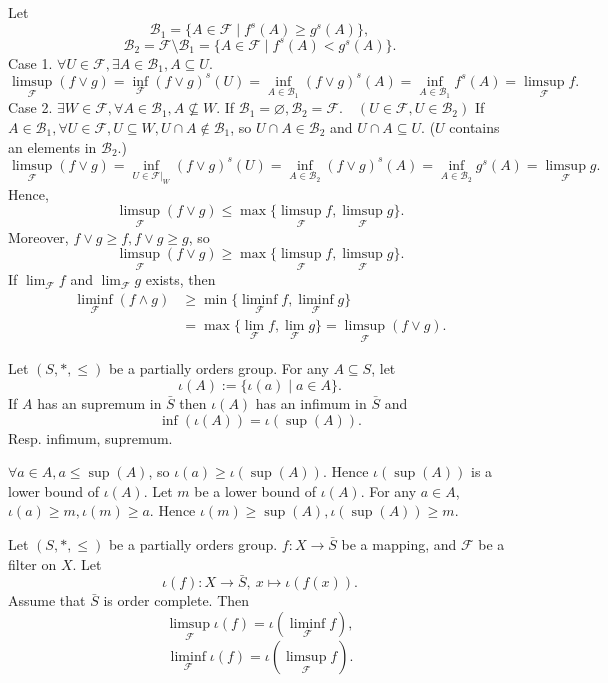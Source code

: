 \begin{proofenv}
    Let $$\mathcal{B}_1=\{A\in \mathcal{F}\mid f^s(A)\ge g^s(A)\},$$
    $$\mathcal{B}_2=\mathcal{F}\setminus\mathcal{B}_1=\{A\in\mathcal{F}\mid f^s(A)<g^s(A)\}.$$
    Case 1. $\forall U\in \mathcal{F},\exists A\in \mathcal{B}_1, A\subseteq U$.
    $$\limsup_\mathcal{F}(f\vee g)=\inf_{\mathcal{F}}(f\vee g)^s(U)=\inf_{A\in \mathcal{B}_1}(f\vee g)^s(A)=\inf _{A\in \mathcal{B}_1}f^s(A)=\limsup_{\mathcal{F}}f.$$
    Case 2. $\exists W\in \mathcal{F}, \forall A\in \mathcal{B}_1,A\nsubseteq  W$. If $\mathcal{B}_1=\varnothing, \mathcal{B}_2=\mathcal{F}.\quad (U\in \mathcal{F},U\in\mathcal{B}_2)$ If $A\in \mathcal{B}_1, \forall U\in \mathcal{F}, U\subseteq W, U\cap A\notin \mathcal{B}_1 $, so $U\cap A\in \mathcal{B}_2$ and $U\cap A\subseteq U$. ($U$ contains an elements in $\mathcal{B}_2$.)
    $$\limsup_{\mathcal{F}}(f\vee g)=\inf _{U\in \mathcal{F}|_W}(f\vee g)^s(U)=\inf_{A\in \mathcal{B}_2}(f\vee g)^s(A)=\inf_{A\in \mathcal{B}_2}g^s(A)=\limsup_{\mathcal{F}}g.$$
    Hence,
    $$\limsup_{\mathcal{F}}(f\vee g)\le \max\{\limsup_{\mathcal{F}}f,\limsup_{\mathcal{F}}g\}.$$
    Moreover, $f\vee g\ge f, f\vee g\ge g$, so
    $$\limsup_{\mathcal{F}}(f\vee g)\ge \max\{\limsup_{\mathcal{F}}f,\limsup_{\mathcal{F}}g\}.$$
    If $\lim_{\mathcal{F}}f$ and $\lim_{\mathcal{F}}g$ exists, then
    \begin{align*}
        \liminf_{\mathcal{F}}(f\wedge g)&\ge \min\{\liminf_{\mathcal{F}}f,\liminf_{\mathcal{F}}g\}\\
        &=\max\{\lim_\mathcal{F} f,\lim_\mathcal{F} g\}=\limsup_{\mathcal{F}}(f\vee g).
    \end{align*}
\end{proofenv}
\begin{propositionenv}
    Let $(S,*,\le)$ be a partially orders group. For any $A\subseteq S$, let 
    $$\iota(A):=\{\iota(a)\mid a\in A\}.$$
    If $A$ has an supremum in $\bar{S}$ then $\iota(A)$ has an infimum in $\bar{S}$ and
    $$\inf(\iota(A))=\iota(\sup(A)).$$
    Resp. infimum, supremum.
\end{propositionenv}
\begin{proofenv}
    \quad \newline
    $\forall a\in A, a\le \sup (A)$, so $\iota(a)\ge \iota(\sup(A))$. Hence $\iota(\sup(A))$ is a lower bound of $\iota(A)$. Let $m$ be a lower bound of $\iota(A)$. For any $a\in A$, $\iota(a)\ge m, \iota(m)\ge a$. Hence $\iota(m)\ge \sup(A),\iota(\sup(A))\ge m$. 
\end{proofenv}
\begin{corollaryenv}
    Let $(S,*,\le)$ be a partially orders group. $f:X\longrightarrow \bar{S}$ be a mapping, and $\mathcal{F}$ be a filter on $X$. Let $$\iota(f):X\longrightarrow \bar{S},\ x\longmapsto \iota(f(x)).$$
    Assume that $\bar{S}$ is order complete. Then 
    $$\limsup_{\mathcal{F}}\iota(f)=\iota(\liminf_{\mathcal{F}}f),$$
    $$\liminf_{\mathcal{F}}\iota(f)=\iota(\limsup_{\mathcal{F}}f).$$
\end{corollaryenv}
